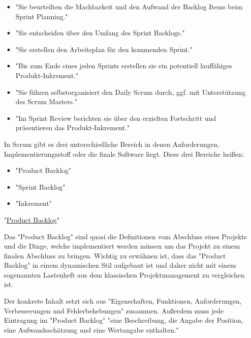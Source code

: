\begin{itemize}
    \item "Sie beurteilten die Machbarkeit und den Aufwand der Backlog Items beim Sprint Planning." \cite{Entwicklungsteam}
    \item "Sie entscheiden über den Umfang des Sprint Backlogs." \cite{Entwicklungsteam}
    \item "Sie erstellen den Arbeitsplan für den kommenden Sprint." \cite{Entwicklungsteam}
    \item "Bis zum Ende eines jeden Sprints erstellen sie ein potentiell lauffähiges Produkt-Inkrement." \cite{Entwicklungsteam}
    \item "Sie führen selbstorganisiert den Daily Scrum durch, ggf. mit Unterstützung des Scrum Masters." \cite{Entwicklungsteam}
    \item "Im Sprint Review berichten sie über den erzielten Fortschritt und präsentieren das Produkt-Inkrement." \cite{Entwicklungsteam}
\end{itemize}


In Scrum gibt es drei unterschiedliche Bereich in denen Anforderungen, Implementierungsstoff oder die finale Software liegt. Diese drei Bereiche heißen:

\begin{itemize}
    \item "Product Backlog"
    \item "Sprint Backlog"
    \item "Inkrement"
\end{itemize}

\cite{Scrum}

"\underline{Product Backlog}"

Das "Product Backlog" sind quasi die Definitionen vom Abschluss eines Projekts und die Dinge, welche implementiert werden müssen um das Projekt zu einem finalen Abschluss zu bringen. Wichtig zu erwähnen ist, dass das "Product Backlog" in einem dynamischen Stil aufgebaut ist und daher nicht mit einem sogenannten Lastenheft aus dem klassischen Projektmanagement zu vergleichen ist.

Der konkrete Inhalt setzt sich aus "Eigenschaften, Funktionen, Anforderungen, Verbesserungen und Fehlerbehebungen" \cite{ProductBacklog} zusammen.  Außerdem muss jede Eintragung im "Product Backlog" "eine Beschreibung, die Angabe der Position, eine Aufwandsschätzung und eine Wertangabe enthalten." \cite{ProductBacklog}

